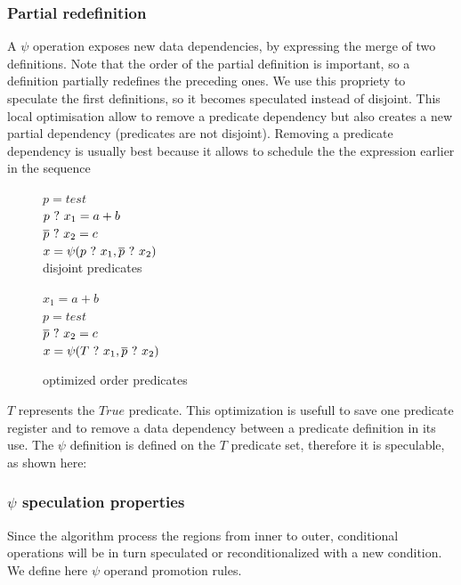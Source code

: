 \subsubsection{Partial redefinition}

A $\psi$ operation exposes new data dependencies, by expressing the merge of two definitions. Note that the order of the partial definition is important, so a definition partially redefines the preceding ones. We use this propriety to speculate the first definitions, so it becomes speculated instead of disjoint. This local optimisation allow to remove a predicate dependency but also creates a new partial dependency (predicates are not disjoint). Removing a predicate dependency is usually best because it allows to schedule the the expression earlier in the sequence

\begin{figure}
\footnotesize
\begin{minipage}{6cm}
$ p = test $ \\
$ p ~?~ x_1 = a + b $ \\
$ \overline{p} ~?~ x_2 = c $ \\
$ x = \psi(p ~?~ x_1, \overline{p} ~?~ x_2) $ \\
\caption{disjoint predicates}
\end{minipage}
\begin{minipage}{6cm}
$ x_1 = a + b $ \\
$ p = test $ \\
$ \overline{p} ~?~ x_2 = c $ \\
$ x = \psi(T ~?~ x_1, \overline{p} ~?~ x_2) $ \\
\caption{optimized order predicates}
\end{minipage}
\end{figure}

$T$ represents the $True$ predicate. This optimization is usefull to save one predicate register and to remove a data dependency between a predicate definition in its use. 
The $\psi$ definition is defined on the $T$ predicate set, therefore it is speculable, as shown here:

\subsubsection{$\psi$ speculation properties}

Since the algorithm process the regions from inner to outer, conditional operations will be in turn speculated or reconditionalized with a new condition. We define here $\psi$ operand promotion rules.

